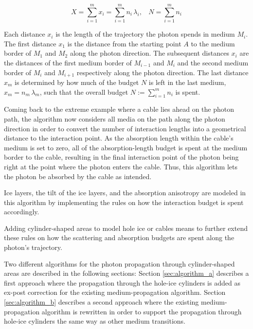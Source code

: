 \begin{equation}
  X = \sum_{i=1}^m x_i = \sum_{i=1}^m n_i\,\lambda_i, \ \ \ \ N = \sum_{i=1}^m n_i
  \label{eq:convertbudgettodistance}
\end{equation}

Each distance $x_i$ is the length of the trajectory the photon spends in medium $M_i$. The first distance $x_1$ is the distance from the starting point $A$ to the medium border of $M_1$ and $M_2$ along the photon direction. The subsequent distances $x_i$ are the distances of the first medium border of $M_{i-1}$ and $M_i$ and the second medium border of $M_i$ and $M_{i+1}$ respectively along the photon direction. The last distance $x_m$ is determined by how much of the budget $N$ is left in the last medium, $x_m = n_m\,\lambda_m$, such that the overall budget $N:=\sum_{i=1}^m n_i$ is spent.

Coming back to the extreme example where a cable lies ahead on the photon path, the algorithm now considers all media on the path along the photon direction in order to convert the number of interaction lengths into a geometrical distance to the interaction point. As the absorption length within the cable's medium is set to zero, all of the absorption-length budget is spent at the medium border to the cable, resulting in the final interaction point of the photon being right at the point where the photon enters the cable. Thus, this algorithm lets the photon be absorbed by the cable as intended.

Ice layers, the tilt of the ice layers, and the absorption anisotropy are modeled in this algorithm by implementing the rules on how the interaction budget is spent accordingly.

Adding cylinder-shaped areas to model hole ice or cables means to further extend these rules on how the scattering and absorption budgets are spent along the photon's trajectory.

Two different algorithms for the photon propagation through cylinder-shaped areas are described in the following sections: Section \ref{sec:algorithm_a} describes a first approach where the propagation through the hole-ice cylinders is added as ex-post correction for the existing medium-propagation algorithm. Section \ref{sec:algorithm_b} describes a second approach where the existing medium-propagation algorithm is rewritten in order to support the propagation through hole-ice cylinders the same way as other medium transitions.
